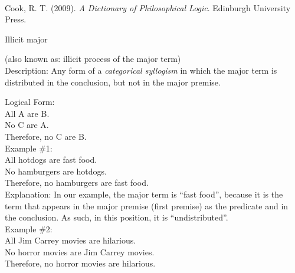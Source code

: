 \documentclass[a4paper,12pt,single,pdftex]{scrbook}
\begin{document}
        
      \\

      
        
          Cook, R. T. (2009). {\it A Dictionary of Philosophical Logic}. Edinburgh University Press.
        
      
    
  

Illicit major
    
      (also known as: illicit process of the major term)
    \\

  
    Description: Any form of a {\it categorical syllogism} in which the major term is distributed in the conclusion, but not in the major premise.

    
      Logical Form:
    \\

    
      All A are B.
    \\

    
      No C are A.
    \\

    
      Therefore, no C are B.
    \\

    
      Example \#1:
    \\

    
      All hotdogs are fast food.
    \\

    
      No hamburgers are hotdogs.
    \\

    
      Therefore, no hamburgers are fast food.
    \\

    
      Explanation: In our example, the major term is “fast food”, because it is the term that appears in the major premise (first premise) as the predicate and in the conclusion.  As such, in this position, it is “undistributed”.
    \\

    
      Example \#2:
    \\

    
      All Jim Carrey movies are hilarious.
    \\

    
      No horror movies are Jim Carrey movies.
    \\

    
      Therefore, no horror movies are hilarious.
    \\
\end{document}
